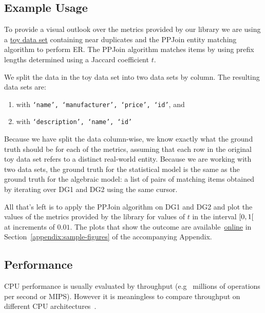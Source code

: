 \documentclass[a4paper,twoside]{article}
\newcommand{\appendixurl}{https://www.cs.ubbcluj.ro/~andrei.olar/article-data/er-metrics-library/02_appendix.pdf}
\begin{document}
    \subsection{Example Usage}

    To provide a visual outlook over the metrics provided by our library we are
    using a \href{https://github.com/matchescu/experiment-data}{toy data set}\cite{expdata2023}
    containing near duplicates and the PPJoin\cite{ppjoin} entity matching
    algorithm to perform ER.
    The PPJoin algorithm matches items by using prefix lengths determined using
    a Jaccard coefficient $t$.
    
    We split the data in the toy data set into two data sets by column.
    The resulting data sets are:
    
    \begin{enumerate}[label={\bfseries DG\arabic*:},leftmargin=1cm]
        \item with \texttt{`name', `manufacturer', `price', `id'},
        and
        \item with \texttt{`description', `name', `id'}\@
    \end{enumerate}

    Because we have split the data column-wise, we know exactly what the ground
    truth should be for each of the metrics, assuming that each row in the
    original toy data set refers to a distinct real-world entity.
    Because we are working with two data sets, the ground truth for the
    statistical model is the same as the ground truth for the algebraic model:
    a list of pairs of matching items obtained by iterating over DG1 and DG2
    using the same cursor.

    All that's left is to apply the PPJoin algorithm on DG1 and DG2 and plot the
    values of the metrics provided by the library for values of $t$ in the
    interval $\rinterval{0}{1}$ at increments of $0.01$.
    The plots that show the outcome are available~\href{\appendixurl}{online} in
    Section~\ref{appendix:sample-figures} of the accompanying Appendix.

    \subsection{Performance}

    CPU performance is usually evaluated by throughput (e.g~ millions of
    operations per second or MIPS).
    However it is meaningless to compare throughput on different CPU
    architectures~\cite{jain1991profiling}.
\end{document}
